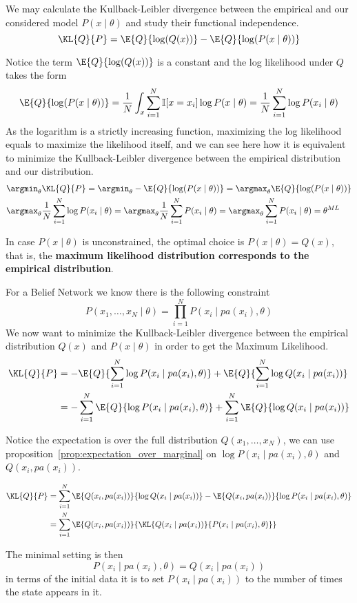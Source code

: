 We may calculate the Kullback-Leibler divergence between the empirical and our considered model \(P(x \mid \theta)\) and study their functional independence.
\[
  \KL{Q}{P} = \E{Q}{\log(Q(x))} - \E{Q}{\log(P(x \mid \theta))}
\]

Notice the term \(\E{Q}{\log(Q(x))}\) is a constant and the log likelihood under \(Q\) takes the form
\[
   \E{Q}{\log(P(x \mid \theta))} = \frac{1}{N}\int_{x}\sum_{i=1}^{N}\mathbb{I}[x = x_{i}]\log{P(x \mid \theta)} = \frac{1}{N}\sum_{i = 1}^N \log{P(x_i \mid \theta)}
 \]
 As the logarithm is
 a strictly increasing function, maximizing the log likelihood equals to
 maximize the likelihood itself, and we can see here how it is equivalent to
 minimize the Kullback-Leibler divergence between the empirical distribution and
 our distribution.
 \[
   \begin{aligned}
     &\argmin_{\theta} \KL{Q}{P} = \argmin_{\theta} - \E{Q}{\log(P(x \mid \theta))} =  \argmax_{\theta} \E{Q}{\log(P(x \mid \theta))}\\
     &\argmax_{\theta} \frac{1}{N}\sum_{i=1}^{N}\log{P(x_{i} \mid \theta)} =  \argmax_{\theta} \frac{1}{N}\sum_{i=1}^{N}P(x_{i} \mid \theta) = \argmax_{\theta} \sum_{i=1}^{N}P(x_{i}\mid \theta)= \theta^{ML}
   \end{aligned}
 \]

 In case \(P(x \mid \theta)\) is unconstrained, the optimal choice is \(P(x \mid \theta) = Q(x)\), that
 is, the \textbf{maximum likelihood distribution corresponds to the empirical distribution}.

 For a Belief Network we know there is the following constraint
 \[
   P(x_{1}, \dots, x_{N} \mid \theta) = \prod_{i = 1}^N P(x_i  \mid  pa(x_i), \theta)
 \]
 We now want to minimize the Kullback-Leibler divergence between the empirical
 distribution \(Q(x)\) and \(P(x \mid \theta)\) in order to get the Maximum Likelihood.
 \[
   \begin{aligned}
   \KL{Q}{P} &= - \E{Q}{\sum_{i = 1}^N\log{P(x_i \mid pa(x_i), \theta)}} +
   \E{Q}{\sum_{i = 1}^N\log{Q(x_i \mid pa(x_i))}}
   \\ &= - \sum_{i =
     1}^N \E{Q}{\log{P(x_i \mid pa(x_i), \theta)}} + \sum_{i =
     1}^N \E{Q}{\log{Q(x_i \mid pa(x_i))}}
   \end{aligned}
 \]

 Notice the expectation is over the full distribution \(Q(x_{1},\dots, x_{N})\), we can use proposition~\ref{prop:expectation_over_marginal} on \(\log{P(x_i \mid pa(x_i), \theta)}\) and \(Q(x_{i}, pa(x_{i}))\).

 \[
   \begin{aligned}
     \KL{Q}{P} &= \sum_{i = 1}^N \E{Q(x_i,pa(x_i))}{\log{Q(x_i \mid pa(x_i))}} - \E{Q(x_i,pa(x_i))}{\log{P(x_i \mid pa(x_i), \theta)}}\\
     &= \sum_{i = 1}^N \E{Q(x_i,pa(x_i))}{\KL{Q(x_i \mid pa(x_i))}{P(x_i \mid pa(x_i), \theta)}}
   \end{aligned}
 \]

 The minimal setting is then
 \[
   P(x_i \mid pa(x_i), \theta) = Q(x_i \mid pa(x_i))
 \]
 in terms of the initial data it is to set \(P(x_i \mid pa(x_i))\) to the number of
 times the state appears in it.
